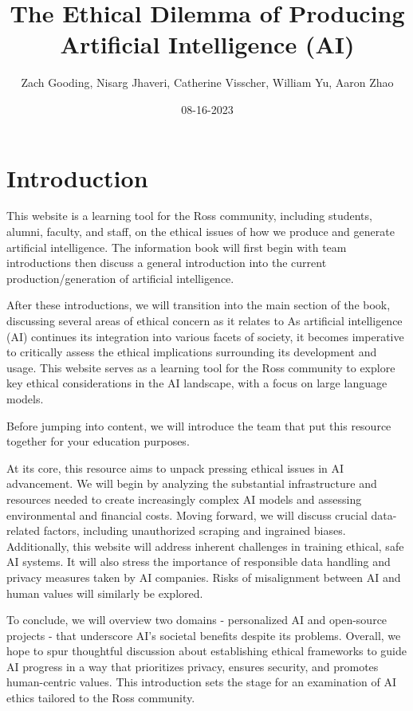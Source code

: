 \documentclass[
]{book}
\title{The Ethical Dilemma of Producing Artificial Intelligence (AI)}
\author{Zach Gooding, Nisarg Jhaveri, Catherine Visscher, William Yu, Aaron Zhao}
\date{08-16-2023}
\begin{document}
\maketitle

{
\setcounter{tocdepth}{1}
\tableofcontents
}
\hypertarget{introduction}{%
\chapter{Introduction}\label{introduction}}

This website is a learning tool for the Ross community, including students, alumni, faculty, and staff, on the ethical issues of how we produce and generate artificial intelligence. The information book will first begin with team introductions then discuss a general introduction into the current production/generation of artificial intelligence.

After these introductions, we will transition into the main section of the book, discussing several areas of ethical concern as it relates to As artificial intelligence (AI) continues its integration into various facets of society, it becomes imperative to critically assess the ethical implications surrounding its development and usage. This website serves as a learning tool for the Ross community to explore key ethical considerations in the AI landscape, with a focus on large language models.

Before jumping into content, we will introduce the team that put this resource together for your education purposes.

At its core, this resource aims to unpack pressing ethical issues in AI advancement. We will begin by analyzing the substantial infrastructure and resources needed to create increasingly complex AI models and assessing environmental and financial costs. Moving forward, we will discuss crucial data-related factors, including unauthorized scraping and ingrained biases.
Additionally, this website will address inherent challenges in training ethical, safe AI systems. It will also stress the importance of responsible data handling and privacy measures taken by AI companies. Risks of misalignment between AI and human values will similarly be explored.

To conclude, we will overview two domains - personalized AI and open-source projects - that underscore AI's societal benefits despite its problems. Overall, we hope to spur thoughtful discussion about establishing ethical frameworks to guide AI progress in a way that prioritizes privacy, ensures security, and promotes human-centric values. This introduction sets the stage for an examination of AI ethics tailored to the Ross community.
\end{document}

